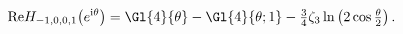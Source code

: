 \begin{equation} 
{\rm Re}H_{-1,0,0,1}\big(e^{{\rm i}\theta}\big)
= \Gl{4}{\theta} - \Gl{4}{\theta; 1}
- \tfrac{3}{4} \zeta_3 \ln\left(2\cos\tfrac{\theta}{2}\right).
\end{equation}

